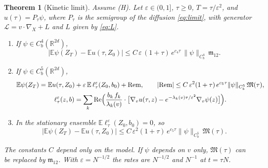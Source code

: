 \documentclass[11pt]{article}
\newcommand{\E}{\mathbb{E}}
\newcommand{\eps}{\varepsilon}
\newcommand{\cL}{\mathcal{L}}
\newcommand{\fm}{\mathfrak{m}}
\newcommand{\fM}{\mathfrak{M}}
\newcommand{\R}{\mathbb{R}}
\renewcommand{\Re}{\operatorname{Re}}
\newcommand{\nrm}[2]{\|#1\|_{#2}}
\newtheorem{theorem}{Theorem}
\theoremstyle{remark}
\begin{document}
\begin{theorem}[Kinetic limit]\label{thm:kin}
Assume (H). Let $\eps\in(0,1]$, $\tau\ge0$, $T=\tau/\eps^2$, and
$u(\tau)=P_\tau\psi$, where $P_\tau$ is the semigroup of the diffusion
\eqref{eq:limit}, with generator $\cL=v\cdot\nabla_X+L$ and $L$ given by
\eqref{eq:L}.
\begin{enumerate}
  \item[(a)] If $\psi\in C_b^4(\R^{2d})$,
    \[
      \bigl|\E\psi(Z_T)-\E u(\tau,Z_0)\bigr|
      \le C\,\eps\,(1+\tau)\,e^{c_4\tau}\,\nrm{\psi}{C_b^4}\,\fm_{12}.
    \]
  \item[(b)] If $\psi\in C_b^5(\R^{2d})$,
    \begin{gather*}
      \E\psi(Z_T)=\E u(\tau,Z_0)+\eps\,\E\,\ell^\eps_\tau(Z_0,b_0)+\mathrm{Rem},
      \qquad
      |\mathrm{Rem}|\le C\,\eps^2(1+\tau)\,e^{c_5\tau}\nrm{\psi}{C_b^5}\,\fM(\tau),\\
      \ell^\eps_\tau(z,b)=\sum_k\Re\Bigl(\frac{b_k\,f_k}{\lambda_k(v)}\cdot
        \bigl[\nabla_vu(\tau,z)-e^{-\lambda_k(v)\tau/\eps^2}\nabla_v\psi(z)\bigr]\Bigr).
    \end{gather*}
  \item[(c)] In the stationary ensemble $\E\ell^\eps_\tau(Z_0,b_0)=0$, so
    \[
      \bigl|\E\psi(Z_T)-\E u(\tau,Z_0)\bigr|
      \le C\,\eps^2(1+\tau)\,e^{c_5\tau}\nrm{\psi}{C_b^5}\,\fM(\tau).
    \]
\end{enumerate}
The constants $C$ depend only on the model. If $\psi$ depends on $v$ only,
$\fM(\tau)$ can be replaced by $\fm_{12}$. With $\eps=N^{-1/2}$ the rates
are $N^{-1/2}$ and $N^{-1}$ at $t=\tau N$.
\end{theorem}
\end{document}
